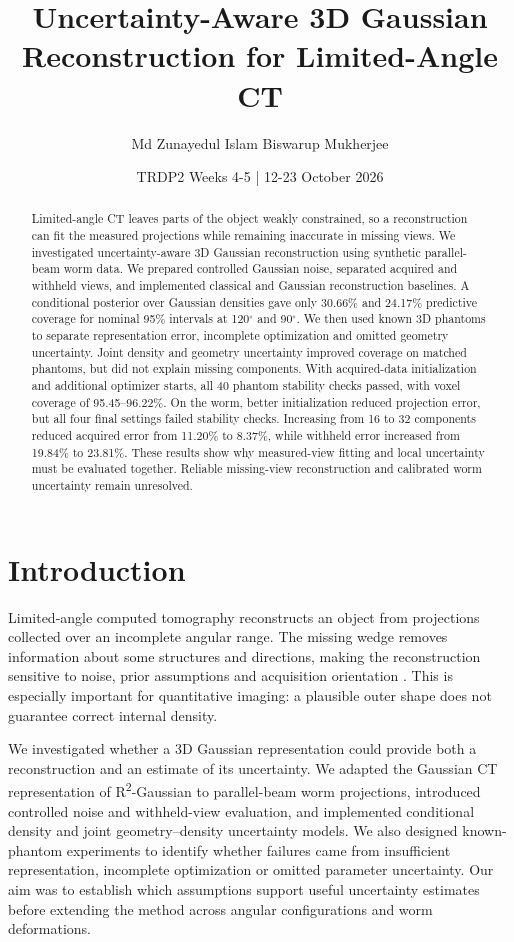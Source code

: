 \documentclass[11pt,a4paper]{article}
\title{\vspace{-1.1cm}\LARGE\bfseries Uncertainty-Aware 3D Gaussian Reconstruction for Limited-Angle CT}
\author{\normalsize Md Zunayedul Islam \qquad Biswarup Mukherjee}
\date{\small TRDP2 Weeks 4-5 | 12-23 October 2026}
\newcommand{\Rtwo}{R\textsuperscript{2}-Gaussian}
\newcommand{\degree}{\ensuremath{^{\circ}}}
\begin{document}
\raggedbottom
\maketitle\vspace{-1.2em}
\begin{abstract}
Limited-angle CT leaves parts of the object weakly constrained, so a reconstruction can fit the measured projections while remaining inaccurate in missing views. We investigated uncertainty-aware 3D Gaussian reconstruction using synthetic parallel-beam worm data. We prepared controlled Gaussian noise, separated acquired and withheld views, and implemented classical and Gaussian reconstruction baselines. A conditional posterior over Gaussian densities gave only 30.66\% and 24.17\% predictive coverage for nominal 95\% intervals at 120\degree{} and 90\degree{}. We then used known 3D phantoms to separate representation error, incomplete optimization and omitted geometry uncertainty. Joint density and geometry uncertainty improved coverage on matched phantoms, but did not explain missing components. With acquired-data initialization and additional optimizer starts, all 40 phantom stability checks passed, with voxel coverage of 95.45--96.22\%. On the worm, better initialization reduced projection error, but all four final settings failed stability checks. Increasing from 16 to 32 components reduced acquired error from 11.20\% to 8.37\%, while withheld error increased from 19.84\% to 23.81\%. These results show why measured-view fitting and local uncertainty must be evaluated together. Reliable missing-view reconstruction and calibrated worm uncertainty remain unresolved.
\end{abstract}

\section{Introduction}
Limited-angle computed tomography reconstructs an object from projections collected over an incomplete angular range. The missing wedge removes information about some structures and directions, making the reconstruction sensitive to noise, prior assumptions and acquisition orientation \cite{kak}. This is especially important for quantitative imaging: a plausible outer shape does not guarantee correct internal density.

We investigated whether a 3D Gaussian representation could provide both a reconstruction and an estimate of its uncertainty. We adapted the Gaussian CT representation of \Rtwo{} \cite{r2} to parallel-beam worm projections, introduced controlled noise and withheld-view evaluation, and implemented conditional density and joint geometry--density uncertainty models. We also designed known-phantom experiments to identify whether failures came from insufficient representation, incomplete optimization or omitted parameter uncertainty. Our aim was to establish which assumptions support useful uncertainty estimates before extending the method across angular configurations and worm deformations.
\end{document}
